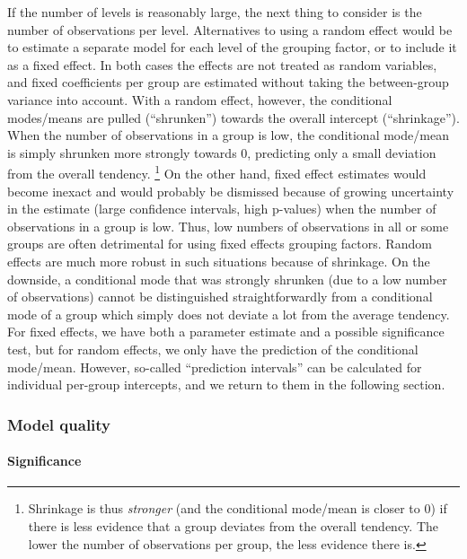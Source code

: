 If the number of levels is reasonably large, the next thing to consider is the number of observations per level.
Alternatives to using a random effect would be to estimate a separate model for each level of the grouping factor, or to include it as a fixed effect.
In both cases the effects are not treated as random variables, and fixed coefficients per group are estimated without taking the between-group variance into account.
With a random effect, however, the conditional modes\slash means are pulled (``shrunken'') towards the overall intercept (``shrinkage'').
When the number of observations in a group is low, the conditional mode\slash mean is simply shrunken more strongly towards $0$, predicting only a small deviation from the overall tendency.%
\footnote{Shrinkage is thus \textit{stronger} (and the conditional mode\slash mean is closer to $0$) if there is less evidence that a group deviates from the overall tendency.
The lower the number of observations per group, the less evidence there is.}
On the other hand, fixed effect estimates would become inexact and would probably be dismissed because of growing uncertainty in the estimate (large confidence intervals, high p-values) when the number of observations in a group is low.
Thus, low numbers of observations in all or some groups are often detrimental for using fixed effects grouping factors.
Random effects are much more robust in such situations because of shrinkage.
On the downside, a conditional mode that was strongly shrunken (due to a low number of observations) cannot be distinguished straightforwardly from a conditional mode of a group which simply does not deviate a lot from the average tendency.
For fixed effects, we have both a parameter estimate and a possible significance test, but for random effects, we only have the prediction of the conditional mode\slash mean.
However, so-called ``prediction intervals'' can be calculated for individual per-group intercepts, and we return to them in the following section.


\subsubsection{Model quality}
\label{sec:significancetestingandcoefficientsofdetermination}

\paragraph{Significance}

